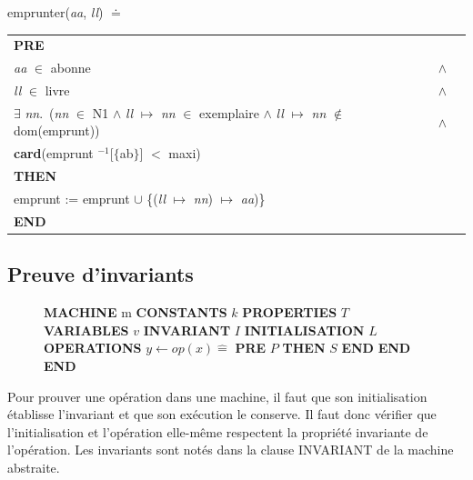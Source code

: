 \documentclass[10pt,a4paper]{article}
\newcommand{\Bequal}{\mathrel{\widehat{=}}}
\begin{document}
\indent emprunter(\emph{aa}, \emph{ll}) $\doteq$
\begin{longtable}{lll}
\textbf{PRE} \tabularnewline
\indent \emph{aa} $\in$ abonne & $\wedge$ \tabularnewline 
\indent \emph{ll} $\in$ livre & $\wedge$ \tabularnewline
\indent $\exists$ \emph{nn}.\ (\emph{nn} $\in$ N1 $\wedge$ \emph{ll} $\mapsto$ \emph{nn} $\in$ exemplaire $\wedge$ \emph{ll} $\mapsto$ \emph{nn} $\notin$ dom(emprunt)) & $\wedge$ \tabularnewline
\indent \textbf{card}(emprunt $^{-1}$[$\{$ab$\}$] $<$ maxi) \tabularnewline
\textbf{THEN} \tabularnewline \indent emprunt := emprunt $\cup$ \{(\emph{ll} $\mapsto$ \emph{nn}) $\mapsto$ \emph{aa})\} \tabularnewline
\textbf{END} \tabularnewline
\end{longtable}

\setlength\LTleft{\fill}

\subsection{Preuve d'invariants}


\setlength{\intextsep}{0pt}%
\setlength{\columnsep}{15pt}%
\begin{figure}
\noindent \textbf{MACHINE} m \newline
\textbf{CONSTANTS} $k$ \newline
\textbf{PROPERTIES} $T$ \newline
\textbf{VARIABLES} $v$ \newline
\textbf{INVARIANT} $I$ \newline
\textbf{INITIALISATION} $L$ \newline
\textbf{OPERATIONS} \newline
$y \leftarrow op(x) \Bequal$ \newline
\hspace*{1em}  \textbf{PRE} $P$ \textbf{THEN} $S$ \newline
\hspace*{2em} \textbf{END} \newline
\hspace*{1em} \textbf{END} \newline
\textbf{END}
\label{M1}
\end{figure}

Pour prouver une opération dans une machine, il faut que son initialisation établisse l'invariant et que son exécution le conserve. Il faut donc vérifier que l'initialisation et l'opération elle-même respectent la propriété invariante de l'opération. Les invariants sont notés dans la clause INVARIANT de la machine abstraite. \\
\end{document}

